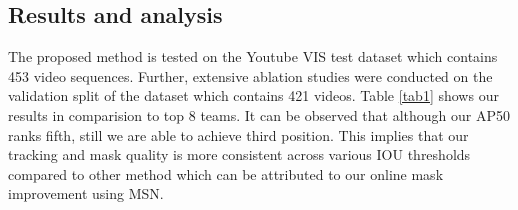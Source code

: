 \documentclass[final]{cvpr}
\begin{document}
\subsection{Results and analysis}

\begin{table}[]

\caption{Results on Youtube VIS 2021 test dataset compared to other participants in the challenge.}
\label{tab1}
\end{table}

The proposed method is tested on the Youtube VIS test dataset which contains 453 video sequences. Further, extensive ablation studies were conducted on the validation split of the dataset which contains 421 videos. Table \ref{tab1} shows our results in comparision to top 8 teams. It can be observed that although our AP50 ranks fifth, still we are able to achieve third position. This implies that our tracking and mask quality is more consistent  across various IOU thresholds compared to other method which can be attributed to our online mask improvement using MSN.
\end{document}
